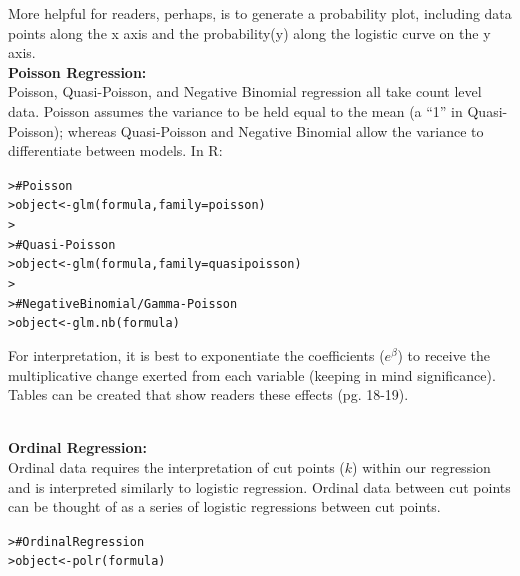 \documentclass[12pt]{article}\usepackage[]{graphicx}\usepackage[]{color}
\makeatletter
\newcommand{\hlcom}[1]{\textcolor[rgb]{0.404,0.408,0.42}{#1}}%
\newcommand{\hlstd}[1]{\textcolor[rgb]{0.882,0.878,0.898}{#1}}%
\newcommand{\hlkwb}[1]{\textcolor[rgb]{0.902,0.675,0.196}{#1}}%
\newcommand{\hlkwc}[1]{\textcolor[rgb]{0.812,0.522,0.388}{#1}}%
\newcommand{\hlkwd}[1]{\textcolor[rgb]{0.733,0.388,0.812}{#1}}%
\newenvironment{kframe}{%
 \def\at@end@of@kframe{}%
 \ifinner\ifhmode%
  \def\at@end@of@kframe{\end{minipage}}%
  \begin{minipage}{\columnwidth}%
 \fi\fi%
 \def\FrameCommand##1{\hskip\@totalleftmargin \hskip-\fboxsep
 \colorbox{shadecolor}{##1}\hskip-\fboxsep
     \hskip-\linewidth \hskip-\@totalleftmargin \hskip\columnwidth}%
 \MakeFramed {\advance\hsize-\width
   \@totalleftmargin\z@ \linewidth\hsize
   \@setminipage}}%
 {\par\unskip\endMakeFramed%
 \at@end@of@kframe}
\newenvironment{knitrout}{}{} %
\makeatother
\begin{document}
\begin{flushleft}
 More helpful for readers, perhaps, is to generate a probability plot, including data points along the x axis and the probability(y) along the logistic curve on the y axis. \\

\clearpage
\noindent \textbf{Poisson Regression:}\\
Poisson, Quasi-Poisson, and Negative Binomial regression all take count level data. Poisson assumes the variance to be held equal to the mean (a ``1'' in Quasi-Poisson); whereas Quasi-Poisson and Negative Binomial allow the variance to differentiate between models. In R:\\

\begin{knitrout}
\color{fgcolor}\begin{kframe}
\begin{alltt}
\hlstd{> }\hlcom{# Poisson}
\hlstd{> }\hlstd{object} \hlkwb{<-} \hlkwd{glm}\hlstd{(formula,} \hlkwc{family} \hlstd{= poisson)}
\hlstd{> }
\hlstd{> }\hlcom{# Quasi-Poisson}
\hlstd{> }\hlstd{object} \hlkwb{<-} \hlkwd{glm}\hlstd{(formula,} \hlkwc{family} \hlstd{= quasipoisson)}
\hlstd{> }
\hlstd{> }\hlcom{# Negative Binomial/ Gamma-Poisson}
\hlstd{> }\hlstd{object} \hlkwb{<-} \hlkwd{glm.nb}\hlstd{(formula)}
\end{alltt}
\end{kframe}
\end{knitrout}

For interpretation, it is best to exponentiate the coefficients ($e^\beta$) to receive the multiplicative change exerted from each variable (keeping in mind significance). Tables can be created that show readers these effects (pg. 18-19).


\hfill \\
\noindent \textbf{Ordinal Regression:}\\
Ordinal data requires the interpretation of cut points ($k$) within our regression and is interpreted similarly to logistic regression. Ordinal data between cut points can be thought of as a series of logistic regressions between cut points.


\begin{knitrout}
\color{fgcolor}\begin{kframe}
\begin{alltt}
\hlstd{> }\hlcom{# Ordinal Regression}
\hlstd{> }\hlstd{object} \hlkwb{<-} \hlkwd{polr}\hlstd{(formula)}
\end{alltt}
\end{kframe}
\end{knitrout}



\end{flushleft}
\end{document}
